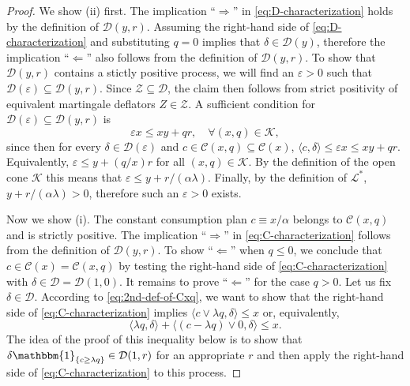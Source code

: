 \documentclass[11pt, oneside]{article}   	%
\theoremstyle{plain}
\theoremstyle{definition}
\theoremstyle{remark}
\begin{document}
\begin{proof}
We show (ii) first. The implication ``$\Rightarrow$'' in \eqref{eq:D-characterization} holds by the definition of $\mathcal{D}(y,r)$. Assuming the right-hand side of \eqref{eq:D-characterization} and substituting $q=0$ implies that $\delta\in\mathcal{D}(y)$, therefore the implication ``$\Leftarrow$'' also follows from the definition of $\mathcal{D}(y,r)$. To show that $\mathcal{D}(y,r)$ contains a stictly positive process, we will find an $\varepsilon>0$ such that $\mathcal{D}(\varepsilon)\subseteq\mathcal{D}(y,r)$. Since $\mathcal{Z}\subseteq\mathcal{D}$, the claim then follows from strict positivity of equivalent martingale deflators $Z\in\mathcal{Z}$. A sufficient condition for $\mathcal{D}(\varepsilon)\subseteq\mathcal{D}(y,r)$ is
$$\varepsilon x\leq xy+qr,\quad \forall (x,q)\in\mathcal{K},$$
since then for every $\delta\in\mathcal{D}(\varepsilon)$ and $c\in\mathcal{C}(x,q)\subseteq\mathcal{C}(x)$, $\langle c,\delta \rangle\leq \varepsilon x\leq xy+qr$. Equivalently, $\varepsilon\leq y+(q/x)r$ for all $(x,q)\in\mathcal{K}$. By the definition of the open cone $\mathcal{K}$ this means that $\varepsilon\leq y+r/(\alpha\lambda)$. Finally, by the definition of $\mathcal{L}^*$, $y+r/(\alpha\lambda)>0$, therefore such an $\varepsilon>0$ exists.

Now we show (i). The constant consumption plan $c\equiv x/\alpha$ belongs to $\mathcal{C}(x,q)$ and is strictly positive. The implication ``$\Rightarrow$'' in \eqref{eq:C-characterization} follows from the definition of $\mathcal{D}(y,r)$. To show ``$\Leftarrow$'' when $q\leq 0$, we conclude that $c\in\mathcal{C}(x)=\mathcal{C}(x,q)$ by testing the right-hand side of \eqref{eq:C-characterization} with $\delta\in\mathcal{D}=\mathcal{D}(1,0)$. It remains to prove ``$\Leftarrow$'' for the case $q>0$. Let us fix $\delta\in\mathcal{D}$. According to \eqref{eq:2nd-def-of-Cxq}, we want to show that the right-hand side of \eqref{eq:C-characterization} implies $\langle c\vee\lambda q,\delta \rangle\leq x$ or, equivalently,
\begin{equation}\label{eq:belong-to-Cx}
\langle\lambda q, \delta \rangle+\langle (c-\lambda q)\vee 0,\delta \rangle\leq x.
\end{equation}
The idea of the proof of this inequality below is to show that $\delta\mathbbm{1}_{\{c\geq\lambda q\}}\in\mathcal{D}(1,r)$ for an appropriate $r$ and then apply the right-hand side of \eqref{eq:C-characterization} to this process.


\end{proof}
\end{document}
